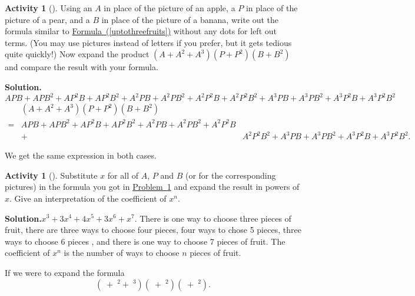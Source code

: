 \documentclass[10pt,]{book}
\theoremstyle{plain}
\theoremstyle{definition}
\newtheorem{activity}[project]{Activity}
\numberwithin{equation}{chapter}
\newcommand{\apple}{\text{🍎}}
\newcommand{\ap}{\apple}
\newcommand{\banana}{\text{🍌}}
\newcommand{\ba}{\banana}
\newcommand{\pear}{\text{🍐}}
\newcommand{\pe}{\pear}
\newcommand{\amp}{&}
\begin{document}
%
\begin{activity}[]\label{twopiecesoffruit}
Using an \(A\) in place of the picture of an apple, a \(P\) in place of the picture of a pear, and a \(B\) in place of the picture of a banana, write out the formula similar to \hyperref[uptothreefruits]{Formula~(\ref{uptothreefruits})} without any dots for left out terms. (You may use pictures instead of letters if you prefer, but it gets tedious quite quickly!) Now expand the product \((A+A^2+A^3)(P+P^2)(B+B^2)\) and compare the result with your formula.%
\par\medskip\noindent%
\textbf{Solution.}\quad \(APB+APB^2 +AP^2B+ AP^2B^2+ A^2PB+A^2PB^2+ A^2P^2B+ A^2P^2B^2+
A^3PB+A^3PB^2 +A^3P^2B+ A^3P^2B^2\)%
\begin{align*}
\amp (A+A^2+A^3)(P+P^2)(B+B^2)\\
=\amp APB+APB^2+AP^2B+AP^2B^2+A^2PB+A^2PB^2+A^2P^2B\\
\amp +\amp A^2P^2B^2+
A^3PB+A^3PB^2+A^3P^2B+A^3P^2B^2.
\end{align*}
%
\par
We get the same expression in both cases.%
\end{activity}
\begin{activity}[]\label{activity-152}
Substitute \(x\) for all of \(A\), \(P\) and \(B\) (or for the corresponding pictures) in the formula you got in \hyperref[twopiecesoffruit]{Problem~\ref{twopiecesoffruit}} and expand the result in powers of \(x\). Give an interpretation of the coefficient of \(x^n\).%
\par\medskip\noindent%
\textbf{Solution.}\quad \(x^3+3x^4+4x^5+3x^6+x^7\). There is one way to choose three pieces of fruit, there are three ways to choose four pieces, four ways to chose 5 pieces, three ways to choose 6 pieces , and there is one way to choose 7 pieces of fruit. The coefficient of \(x^n\) is the number of ways to choose \(n\) pieces of fruit.%
\end{activity}
If we were to expand the formula%
\begin{equation}
(\ap+\ap^2+\ap^3)(\pe+\pe^2)(\ba+\ba^2).\label{threefruitsagain}
\end{equation}
\end{document}
